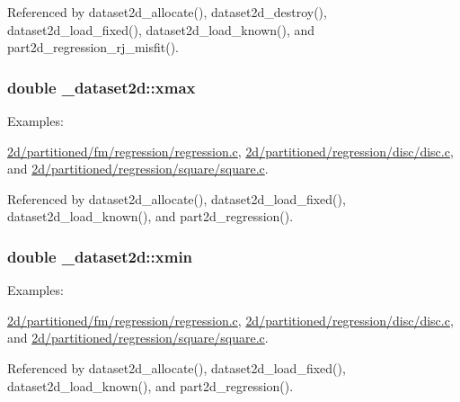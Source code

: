 Referenced by dataset2d\+\_\+allocate(), dataset2d\+\_\+destroy(), dataset2d\+\_\+load\+\_\+fixed(), dataset2d\+\_\+load\+\_\+known(), and part2d\+\_\+regression\+\_\+rj\+\_\+misfit().

\subsubsection[{\texorpdfstring{xmax}{xmax}}]{\setlength{\rightskip}{0pt plus 5cm}double \+\_\+dataset2d\+::xmax}\hypertarget{struct__dataset2d_aab6f2e4c4061819ec9fa8ef6cf670308}{}\label{struct__dataset2d_aab6f2e4c4061819ec9fa8ef6cf670308}
\begin{Desc}
\item[Examples\+: ]\par
\hyperlink{2d_2partitioned_2fm_2regression_2regression_8c-example}{2d/partitioned/fm/regression/regression.\+c}, \hyperlink{2d_2partitioned_2regression_2disc_2disc_8c-example}{2d/partitioned/regression/disc/disc.\+c}, and \hyperlink{2d_2partitioned_2regression_2square_2square_8c-example}{2d/partitioned/regression/square/square.\+c}.\end{Desc}


Referenced by dataset2d\+\_\+allocate(), dataset2d\+\_\+load\+\_\+fixed(), dataset2d\+\_\+load\+\_\+known(), and part2d\+\_\+regression().

\subsubsection[{\texorpdfstring{xmin}{xmin}}]{\setlength{\rightskip}{0pt plus 5cm}double \+\_\+dataset2d\+::xmin}\hypertarget{struct__dataset2d_afcbe18cdc63b6634a0b6d9c15ab6beb7}{}\label{struct__dataset2d_afcbe18cdc63b6634a0b6d9c15ab6beb7}
\begin{Desc}
\item[Examples\+: ]\par
\hyperlink{2d_2partitioned_2fm_2regression_2regression_8c-example}{2d/partitioned/fm/regression/regression.\+c}, \hyperlink{2d_2partitioned_2regression_2disc_2disc_8c-example}{2d/partitioned/regression/disc/disc.\+c}, and \hyperlink{2d_2partitioned_2regression_2square_2square_8c-example}{2d/partitioned/regression/square/square.\+c}.\end{Desc}


Referenced by dataset2d\+\_\+allocate(), dataset2d\+\_\+load\+\_\+fixed(), dataset2d\+\_\+load\+\_\+known(), and part2d\+\_\+regression().

